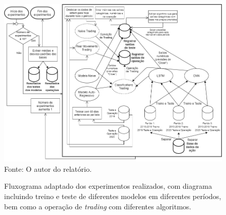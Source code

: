 \begin{figure}[hbt]
\centering
\caption{\label{figure:figura1}Fluxograma adaptado dos experimentos realizados, com diagrama incluindo treino e teste de diferentes modelos em diferentes períodos, bem como a operação de \textit{trading} com diferentes algoritmos.}
  \includegraphics[scale=0.52]{figures/img17.png}
  Fonte: O autor do relatório.
\end{figure}